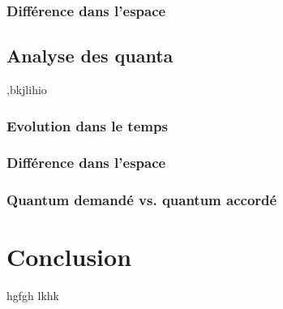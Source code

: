 \subsubsection{Différence dans l'espace}

\subsection{Analyse des quanta}
,bkjlihio
\subsubsection{Evolution dans le temps}
\subsubsection{Différence dans l'espace}
\subsubsection{Quantum demandé vs. quantum accordé}

\section{Conclusion}
\label{sec:demo:conclusion}
hgfgh
lkhk